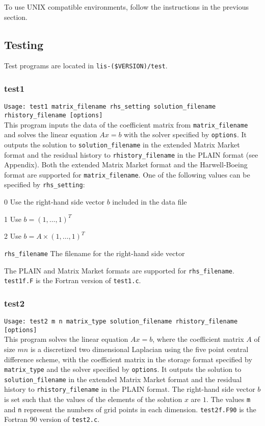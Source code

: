 \documentclass[a4paper]{article}
\newcommand{\namelistlabel}[1]{\mbox{#1}\hfill}
\newenvironment{namelist}[1]{%
\begin{list}{}
  {\let\makelabel\namelistlabel
  \settowidth{\labelwidth}{#1}
  \setlength{\leftmargin}{1.1\labelwidth}}
  }{%
\end{list}}
\begin{document}
To use UNIX compatible environments, follow the instructions in the
previous section. 

\subsection{Testing}

Test programs are located in {\tt lis-(\$VERSION)/test}.

\subsubsection{test1}

\verb+Usage: test1 matrix_filename rhs_setting solution_filename rhistory_filename [options]+\\

This program inputs the data of the coefficient matrix from {\tt matrix\_filename} and solves the linear equation $Ax=b$ with 
the solver specified by {\tt options}. 
It outputs the solution to 
{\tt solution\_filename} in the extended 
Matrix Market format and 
the residual history to {\tt rhistory\_filename} in the PLAIN format (see Appendix).
Both the extended Matrix Market format and the Harwell-Boeing format are
supported for {\tt matrix\_filename}. 
One of the following values can be specified by {\tt rhs\_setting}:
\begin{namelist}{XXXXXXXXXXXXXXXXXXXX}
\item[0] Use the right-hand side vector $b$ included in the data file
\item[1] Use $b = (1,\dots,1)^T$
\item[2] Use $b = A \times (1,\dots,1)^T$
\item[\tt rhs\_filename] The filename for the right-hand side vector 
\end{namelist}
The PLAIN and Matrix Market formats are supported for {\tt rhs\_filename}. 
{\tt test1f.F} is the Fortran version of {\tt test1.c}.

\subsubsection{test2}

\verb+Usage: test2 m n matrix_type solution_filename rhistory_filename [options]+\\

This program solves the linear equation $Ax = b$, where the coefficient 
matrix $A$ of size $mn$ is a discretized two dimensional 
Laplacian using the five
point central difference scheme, with the coefficient matrix 
in the storage format specified
by \verb|matrix_type| and the solver specified by {\tt options}. 
It outputs the solution to {\tt solution\_filename} in the extended 
Matrix Market format and 
the residual history to {\tt rhistory\_filename} in the PLAIN format. 
The right-hand side vector $b$ is set such that the values of the elements
of the solution $x$ are $1$. 
The values {\tt m} and  {\tt n} represent the numbers of grid points
in each dimension. 
{\tt test2f.F90} is the Fortran 90 version of {\tt test2.c}.
\end{document}
